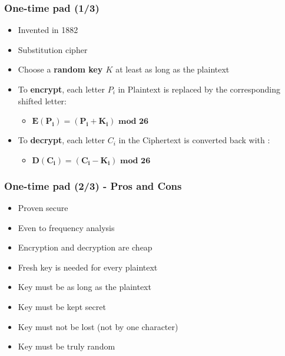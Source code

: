 \documentclass[
hyperref={pdfpagelabels=false}
,xcolor=table
]
{beamer}
\newcommand{\plus}{{\texttt{[image: plus.png]}}}
\newcommand{\minus}{{\texttt{[image: minus.png]}}}
\begin{document}
\begin{frame}
  \frametitle{One-time pad (1/3)}
  \begin{itemize}
  \item Invented in 1882
  \item Substitution cipher
  \item Choose a \textbf{random key $K$} \alert{at least as long as the plaintext}
  \item To \textbf{encrypt}, each letter $P_i$ in Plaintext is replaced by the corresponding shifted letter:
    \begin{itemize}
    \item[] $\bm{E(P_i) = (P_i + K_i) \mbox{ mod } 26}$
    \end{itemize}
  \item To \textbf{decrypt}, each letter $C_i$ in the Ciphertext is converted back with :
    \begin{itemize}
    \item[] $\bm{D(C_i) = (C_i - K_i) \mbox{ mod } 26}$ 
    \end{itemize} 
  \end{itemize}
  
\end{frame}


\begin{frame}
  \frametitle{One-time pad  (2/3) - Pros and Cons }

  \begin{itemize}
  \item[\plus] Proven secure
  \item[\plus] Even to frequency analysis
  \item[\plus] Encryption and decryption are cheap
  \item[\minus] Fresh key is needed for every plaintext 
  \item[\minus] Key must be as long as the plaintext 
  \item[\minus] Key must be kept secret
  \item[\minus] Key must not be lost (not by one character)  
  \item[\minus] Key must be truly random 
  \end{itemize}
\end{frame}
\end{document}
